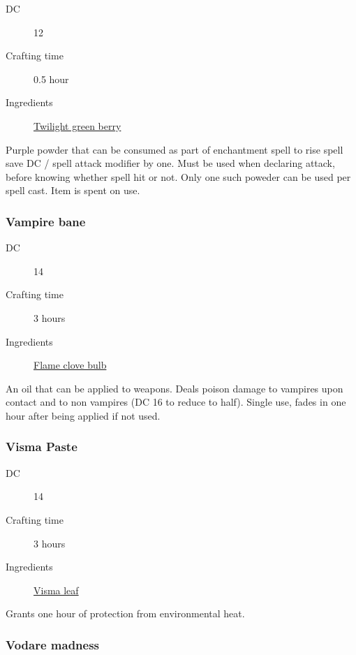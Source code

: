 \begin{description}
\item [DC] 12 \arcana
\item [Crafting time] 0.5 hour
\item [Ingredients] \hyperref[Twilight Green]{Twilight green berry}
\end{description}

Purple powder that can be consumed as part of enchantment spell to rise  spell save DC / spell attack modifier by one. Must be used when declaring attack, before knowing whether spell hit or not. Only one such poweder can be used per spell cast. Item is spent on use.

\subsubsection{Vampire bane}
\label{Vampire bane}

\begin{description}
\item [DC] 14
\item [Crafting time] 3 hours
\item [Ingredients] \hyperref[Flame clove]{Flame clove bulb}
\end{description}

An oil that can be applied to weapons. Deals  poison damage to vampires upon contact and 
 to non vampires (DC 16 \constitutionsave{} to reduce to half). Single use, fades in one hour after being applied if not used.

\subsubsection{Visma Paste}
\label{Visma Paste}

\begin{description}
\item [DC] 14 \survival
\item [Crafting time] 3 hours
\item [Ingredients] \hyperref[Visma]{Visma leaf}
\end{description}

Grants one hour of protection from environmental heat.

\subsubsection{Vodare madness}
\label{Vodare madness}

